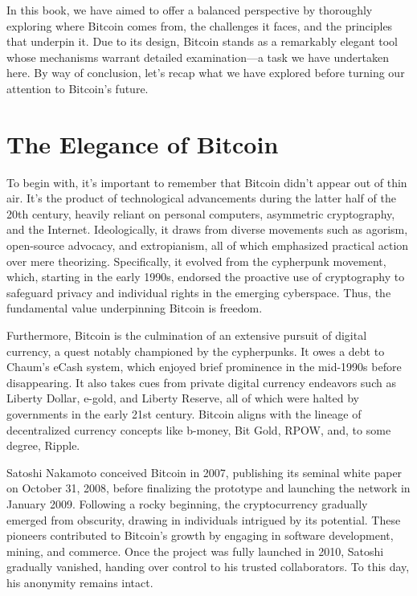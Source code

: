\documentclass[
  a5paper,
  smalldemyvopaper,10pt,twoside,onecolumn,openright,extrafontsizes,hidelinks]{memoir}
\begin{document}
In this book, we have aimed to offer a balanced perspective by
thoroughly exploring where Bitcoin comes from, the challenges it faces,
and the principles that underpin it. Due to its design, Bitcoin stands
as a remarkably elegant tool whose mechanisms warrant detailed
examination---a task we have undertaken here. By way of conclusion,
let's recap what we have explored before turning our attention to
Bitcoin's future.

\section*{The Elegance of Bitcoin}\label{the-elegance-of-bitcoin}


To begin with, it's important to remember that Bitcoin didn't appear out
of thin air. It's the product of technological advancements during the
latter half of the 20th century, heavily reliant on personal computers,
asymmetric cryptography, and the Internet. Ideologically, it draws from
diverse movements such as agorism, open-source advocacy, and
extropianism, all of which emphasized practical action over mere
theorizing. Specifically, it evolved from the cypherpunk movement,
which, starting in the early 1990s, endorsed the proactive use of
cryptography to safeguard privacy and individual rights in the emerging
cyberspace. Thus, the fundamental value underpinning Bitcoin is freedom.

Furthermore, Bitcoin is the culmination of an extensive pursuit of
digital currency, a quest notably championed by the cypherpunks. It owes
a debt to Chaum's eCash system, which enjoyed brief prominence in the
mid-1990s before disappearing. It also takes cues from private digital
currency endeavors such as Liberty Dollar, e-gold, and Liberty Reserve,
all of which were halted by governments in the early 21st century.
Bitcoin aligns with the lineage of decentralized currency concepts like
b-money, Bit Gold, RPOW, and, to some degree, Ripple.

Satoshi Nakamoto conceived Bitcoin in 2007, publishing its seminal white
paper on October 31, 2008, before finalizing the prototype and launching
the network in January 2009. Following a rocky beginning, the
cryptocurrency gradually emerged from obscurity, drawing in individuals
intrigued by its potential. These pioneers contributed to Bitcoin's
growth by engaging in software development, mining, and commerce. Once
the project was fully launched in 2010, Satoshi gradually vanished,
handing over control to his trusted collaborators. To this day, his
anonymity remains intact.
\end{document}
